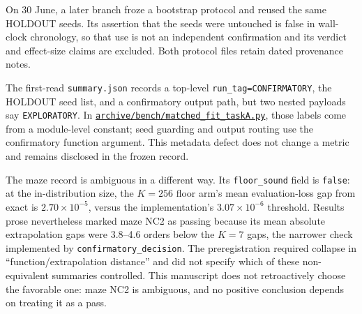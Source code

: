 On 30 June, a later branch froze a bootstrap protocol and reused the same
HOLDOUT seeds. Its assertion that the seeds were untouched is false in
wall-clock chronology, so that use is not an independent confirmation and
its verdict and effect-size claims are excluded. Both protocol files retain
dated provenance notes.

The first-read \texttt{summary.json} records a top-level
\texttt{run\_tag=CONFIRMATORY}, the HOLDOUT seed list, and a confirmatory
output path, but two nested payloads say \texttt{EXPLORATORY}. In
\href{https://github.com/vanshsehrawat14/gabp-sparse-inv/blob/main/archive/bench/matched_fit_taskA.py}
{\nolinkurl{archive/bench/matched_fit_taskA.py}}, those labels come from a module-level
constant; seed guarding and output routing use the confirmatory function
argument. This metadata defect does not change a metric and remains disclosed
in the frozen record.

The maze record is ambiguous in a different way. Its \texttt{floor\_sound} field
is \texttt{false}: at the in-distribution size, the $K=256$ floor arm's mean
evaluation-loss gap from exact is $2.70\times10^{-5}$, versus the
implementation's $3.07\times10^{-6}$ threshold. Results prose nevertheless
marked maze NC2 as passing because its mean absolute extrapolation gaps were
3.8--4.6 orders below the $K=7$ gaps, the narrower check implemented by
\texttt{confirmatory\_decision}. The preregistration required collapse in
``function/extrapolation distance'' and did not specify which of these
non-equivalent summaries controlled. This manuscript does not retroactively
choose the favorable one: maze NC2 is ambiguous, and no positive conclusion
depends on treating it as a pass.

